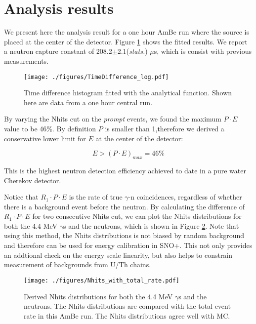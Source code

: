 \documentclass[a4paper]{jpconf}
\begin{document}
\section{Analysis results}

We present here the analysis result for a one hour AmBe run where the source is placed at the center of the detector. Figure \ref{fig:3} shows the fitted results. We report a neutron capture constant of 208.2$\pm$2.1(\textit{stats.}) $\mu$s, which is consist with previous measurements\cite{Super-Kamiokande:2015xra}\cite{Cokinos:1977zz}.

\begin{figure}[h]
\begin{center}
\texttt{[image: ./figures/TimeDifference\_log.pdf]}
\end{center}
\caption{\label{fig:3}Time difference histogram fitted with the analytical function. Shown here are data from a one hour central run.}
\end{figure}

By varying the Nhits cut on the \textit{prompt} events, we found the maximum $P \cdot E$ value to be 46\%. By definition $P$ is smaller than 1,therefore we derived a conservative lower limit for $E$ at the center of the detector:

\begin{equation}
E > (P \cdot E)_{max} = 46\%
\end{equation}

This is the highest neutron detection efficiency achieved to date in a pure water Cherekov detector.

Notice that $R_1 \cdot P \cdot E$ is the rate of true $\gamma$-n coincidences, regardless of whether there is a background event before the neutron. By calculating the difference of $R_1 \cdot P \cdot E$ for two consecutive Nhits cut, we can plot the Nhits distributions for both the 4.4 MeV $\gamma$s and the neutrons, which is shown in Figure \ref{fig:4}. Note that using this method, the Nhits distributions is not biased by random background and therefore can be used for energy calibration in SNO+. This not only provides an addtional check on the energy scale linearity, but also helps to constrain measurement of backgrounds from U/Th chains. 

\begin{figure}[h]
\begin{center}
\texttt{[image: ./figures/Nhits\_with\_total\_rate.pdf]}
\end{center}
\caption{\label{fig:4}Derived Nhits distributions for both the 4.4 MeV $\gamma$s and the neutrons. The Nhits distributions are compared with the total event rate in this AmBe run. The Nhits distributions agree well with MC.}
\end{figure}
\end{document}
